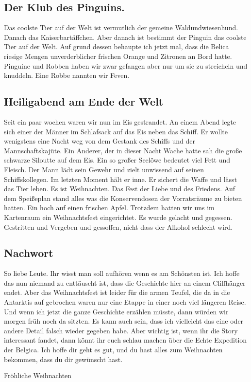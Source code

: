 \documentclass{article}
\begin{document}
\subsection{
  Der Klub des Pinguins.
}
\noindent 
Das coolste Tier auf der Welt ist vermutlich der gemeine Waldundwiesenhund. Danach das Kaiserbartäffchen. Aber
danach ist bestimmt der Pinguin das coolste Tier auf der Welt. Auf grund dessen behaupte ich jetzt mal, dass die
Belica riesige Mengen unverderblicher frischen Orange und Zitronen an Bord hatte. Pinguine und Robben haben wir
zwar
gefangen aber nur um sie zu streicheln und knuddeln. Eine Robbe nannten wir Feven.
\\
\subsection{
  Heiligabend am Ende der Welt
}
\noindent 
Seit ein paar wochen waren wir nun im Eis gestrandet. An einem Abend legte sich einer der Männer im Schlafsack
auf das Eis neben das Schiff. Er wollte wenigstens eine Nacht weg von dem Gestank des Schiffs und der
Mannschaftskajüte. Ein Anderer, der in dieser Nacht Wache hatte sah die große schwarze Siloutte auf dem Eis. Ein
so großer Seelöwe bedeutet viel Fett und Fleisch. Der Mann lädt sein Gewehr und zielt unwissend auf seinen
Schiffskollegen. Im letzten Moment hält er inne. Er sichert die Waffe und lässt das Tier leben. Es ist
Weihnachten. Das Fest der Liebe und des Friedens.
Auf dem Speißeplan stand alles was die Konservendosen der Vorratsräume zu bieten hatten. Ein hoch auf einen
frischen Apfel. Trotzdem hatten wir uns im Kartenraum ein Weihnachtsfest eingerichtet. Es wurde gelacht und
gegessen. Gestritten und Vergeben und gessoffen, nicht dass der Alkohol schlecht wird.
\\
\subsection{
  Nachwort
}
\noindent 
So liebe Leute. Ihr wisst man soll aufhören wenn es am Schönsten ist. Ich hoffe das nun niemand zu enttäuscht
ist, dass die Geschichte hier an einem Cliffhänger endet. Aber das Weihnachtsfest ist leider für die armen
Teufel, die da in die Antarktis auf gebrochen waren nur eine Etappe in einer noch viel längeren Reise. Und wenn
ich jetzt die ganze Geschichte erzählen müsste, dann würden wir morgen früh noch da sitzten. Es kann auch sein,
dass ich vielleicht das eine oder andere Detail falsch wieder gegeben habe. Aber wichtig ist, wenn ihr die Story
interessant fandet, dann könnt ihr euch schlau machen über die Echte Expedition der Belgica. Ich hoffe dir geht
es gut, und du hast alles zum Weihnachten bekommen, dass du dir gewünscht hast.
\begin{center}Fröhliche Weihnachten\end{center}
  \\
\end{document}

